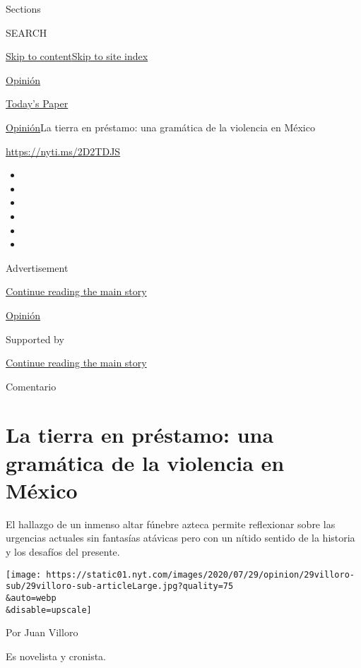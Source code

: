 Sections

SEARCH

\protect\hyperlink{site-content}{Skip to
content}\protect\hyperlink{site-index}{Skip to site index}

\href{https://www.nytimes.com/es/section/opinion}{Opinión}

\href{https://myaccount.nytimes.com/auth/login?response_type=cookie\&client_id=vi}{}

\href{https://www.nytimes.com/section/todayspaper}{Today's Paper}

\href{/es/section/opinion}{Opinión}\textbar{}La tierra en préstamo: una
gramática de la violencia en México

\url{https://nyti.ms/2D2TDJS}

\begin{itemize}
\item
\item
\item
\item
\item
\item
\end{itemize}

Advertisement

\protect\hyperlink{after-top}{Continue reading the main story}

\href{/es/section/opinion}{Opinión}

Supported by

\protect\hyperlink{after-sponsor}{Continue reading the main story}

Comentario

\hypertarget{la-tierra-en-pruxe9stamo-una-gramuxe1tica-de-la-violencia-en-muxe9xico}{%
\section{La tierra en préstamo: una gramática de la violencia en
México}\label{la-tierra-en-pruxe9stamo-una-gramuxe1tica-de-la-violencia-en-muxe9xico}}

El hallazgo de un inmenso altar fúnebre azteca permite reflexionar sobre
las urgencias actuales sin fantasías atávicas pero con un nítido sentido
de la historia y los desafíos del presente.

\texttt{[image: https://static01.nyt.com/images/2020/07/29/opinion/29villoro-sub/29villoro-sub-articleLarge.jpg?quality=75\\\&auto=webp\\\&disable=upscale]}

Por Juan Villoro

Es novelista y cronista.

